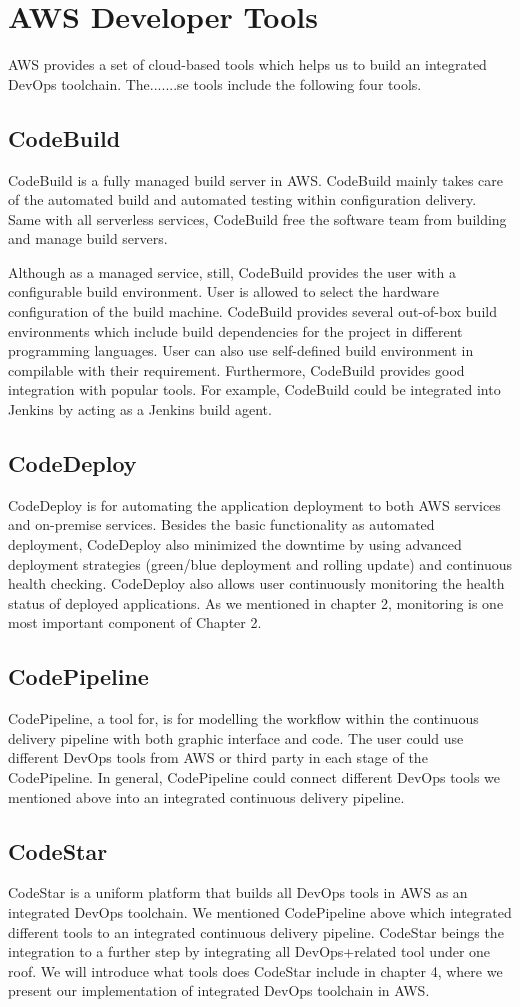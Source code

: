 \section{AWS Developer Tools}
AWS provides a set of cloud-based tools which helps us to build an integrated DevOps toolchain. The.......se tools include the following four tools.
\subsection{CodeBuild}
CodeBuild is a fully managed build server in AWS. CodeBuild mainly takes care of the automated build and automated testing within configuration delivery. Same with all serverless services, CodeBuild free the software team from building and manage build servers.
\par
Although as a managed service, still, CodeBuild provides the user with a configurable build environment. User is allowed to select the hardware configuration of the build machine. CodeBuild provides several out-of-box build environments which include build dependencies for the project in different programming languages. User can also use self-defined build environment in compilable with their requirement.
Furthermore, CodeBuild provides good integration with popular tools. For example, CodeBuild could be integrated into Jenkins by acting as a Jenkins build agent.
\subsection{CodeDeploy}
CodeDeploy is for automating the application deployment to both AWS services and on-premise services. 
Besides the basic functionality as automated deployment, CodeDeploy also minimized the downtime by using advanced deployment strategies (green/blue deployment and rolling update) and continuous health checking. 
CodeDeploy also allows user continuously monitoring the health status of deployed applications. As we mentioned in chapter 2, monitoring is one most important component of Chapter 2.
\subsection{CodePipeline}
CodePipeline, a tool for, is for modelling the workflow within the continuous delivery pipeline with both graphic interface and code. The user could use different DevOps tools from AWS or third party in each stage of the CodePipeline. In general, CodePipeline could connect different DevOps tools we mentioned above into an integrated continuous delivery pipeline.
\subsection{CodeStar}
CodeStar is a uniform platform that builds all DevOps tools in AWS as an integrated DevOps toolchain. We mentioned CodePipeline above which integrated different tools to an integrated continuous delivery pipeline. CodeStar beings the integration to a further step by integrating all DevOps+related tool under one roof. We will introduce what tools does CodeStar include in chapter 4, where we present our implementation of integrated DevOps toolchain in AWS.
